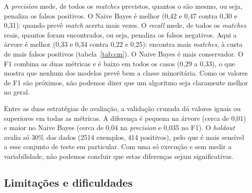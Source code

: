 \documentclass[12pt,a4paper]{article}
\begin{document}
A \emph{precision} mede, de todos os \emph{matches} previstos, quantos o são mesmo, ou seja, penaliza os falsos positivos. O Naive Bayes é melhor (0,42 e 0,47 contra 0,30 e 0,31): quando prevê \emph{match} acerta mais vezes. O \emph{recall} mede, de todos os \emph{matches} reais, quantos foram encontrados, ou seja, penaliza os falsos negativos. Aqui a árvore é melhor (0,33 e 0,34 contra 0,22 e 0,25): encontra mais \emph{matches}, à custa de mais falsos positivos (tabela~\ref{tab:cm}). O Naive Bayes é mais conservador. O F1 combina as duas métricas e é baixo em todos os casos (0,29 a 0,33), o que mostra que nenhum dos modelos prevê bem a classe minoritária. Como os valores de F1 são próximos, não podemos dizer que um algoritmo seja claramente melhor no geral.

Entre as duas estratégias de avaliação, a validação cruzada dá valores iguais ou superiores em todas as métricas. A diferença é pequena na árvore (cerca de 0,01) e maior no Naive Bayes (cerca de 0,04 na \emph{precision} e 0,035 no F1). O \emph{holdout} avalia só 30\% dos dados (2514 exemplos, 414 positivos), pelo que é mais sensível a esse conjunto de teste em particular. Com uma só execução e sem medir a variabilidade, não podemos concluir que estas diferenças sejam significativas.

\subsection{Limitações e dificuldades}
\label{sec:limitacoes}
\end{document}
